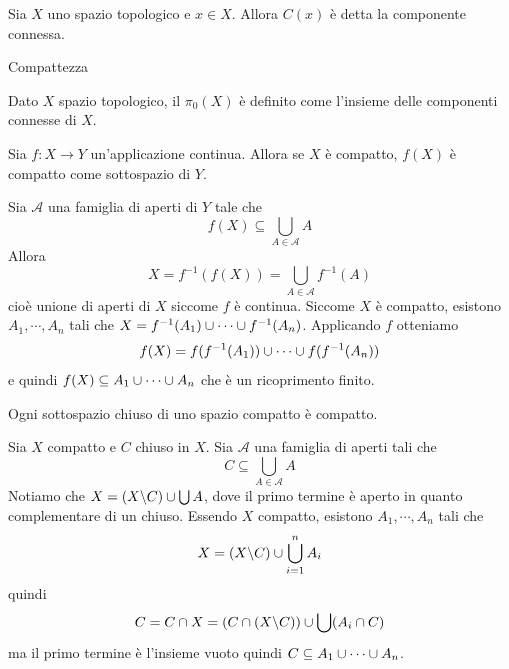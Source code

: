 \documentclass[a4paper]{article}
\begin{document}
\begin{snippetdefinition}{}
    Sia \(X\) uno spazio topologico e \(x\in X\).
    Allora \(C(x)\) è detta la componente connessa.
\end{snippetdefinition}

\begin{snippetdefinition}{Compattezza}
\end{snippetdefinition}


\begin{snippetdefinition}{}
    Dato \(X\) spazio topologico,
    il \(\pi_0(X)\) è definito
    come l'insieme delle componenti connesse di \(X\).
\end{snippetdefinition}

\begin{snippettheorem}{}
    Sia \(f \colon X \to Y\) un'applicazione continua.
    Allora se \(X\) è compatto, \(f(X)\) è compatto come sottospazio di \(Y\).
\end{snippettheorem}

\begin{snippetproof}{}
    Sia \(\mathcal{A}\) una famiglia di aperti di \(Y\) tale che
    \[
        f(X) \subseteq \bigcup_{A \in \mathcal{A}} A
    \]
    Allora \[X = f^{-1}(f(X)) = \bigcup_{A \in \mathcal{A}} f^{-1}(A)\]
    cioè unione di aperti di \(X\) siccome \(f\) è continua.
    Siccome \(X\) è compatto, esistono \(A_1, \cdots, A_n\)
    tali che \(X = f^{-1}(A_1) \cup \cdots \cup f^{-1}(A_n)\).
    Applicando \(f\) otteniamo
    \[
        f(X) = f(f^{-1}(A_1)) \cup \cdots \cup f(f^{-1}(A_n))
    \]
    e quindi \(f(X) \subseteq A_1 \cup \cdots \cup A_n\) che è un ricoprimento finito.
\end{snippetproof}

\begin{snippetproposition}{}
    Ogni sottospazio chiuso di uno spazio compatto è compatto.
\end{snippetproposition}

\begin{snippetproof}{}
    Sia \(X\) compatto e \(C\) chiuso in \(X\).
    Sia \(\mathcal{A}\) una famiglia di aperti tali che
    \[
        C \subseteq \bigcup_{A \in \mathcal{A}} A
    \]
    Notiamo che \(X = (X \backslash C) \cup \bigcup A\), dove il primo termine è aperto in quanto complementare
    di un chiuso.
    Essendo \(X\) compatto,
    esistono \(A_1, \cdots, A_n\)
    tali che
    \[
        X = (X \backslash C) \cup \bigcup_{i=1}^n A_i
    \]
    quindi
    \[
        C = C \cap X = (C \cap (X \backslash C))
        \cup \bigcup (A_i \cap C)
    \]
    ma il primo termine è l'insieme vuoto quindi \(C \subseteq A_1 \cup \cdots \cup A_n\).
\end{snippetproof}
\end{document}
